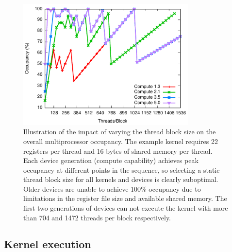 \begin{figure}[htb]
    \centering
    \includegraphics[width=0.8\textwidth]{images/sec-4/occupancy/occupancy}
    \caption[Impact of varying thread block size on multiprocessor occupancy]{
        Illustration of the impact of varying the thread block size on the
        overall multiprocessor occupancy. The example kernel requires 22
        registers per thread and 16 bytes of shared memory per thread. Each
        device generation (compute capability) achieves peak occupancy at
        different points in the sequence, so selecting a static thread block
        size for all kernels and devices is clearly suboptimal. Older devices
        are unable to achieve 100\% occupancy due to limitations in the register
        file size and available shared memory. The first two generations of
        devices can not execute the kernel with more than 704 and 1472 threads
        per block respectively.}
    \label{fig:occupancy}
\end{figure}


\subsection{Kernel execution}

